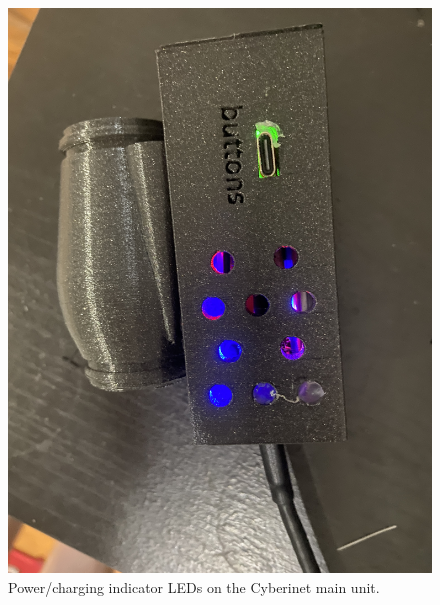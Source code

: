 \begin{figure}
    \centering
    \includegraphics[scale=0.05]{diagrams/IMG_2210.JPG}
    \caption{Power/charging indicator LEDs on the Cyberinet main unit.}
    \label{fig:cyberinetLEDs}
\end{figure}

